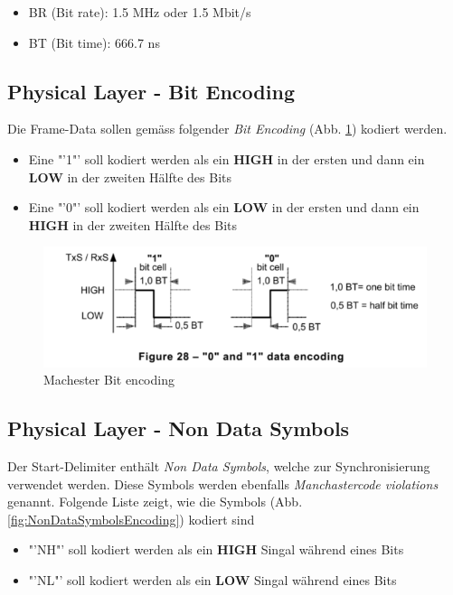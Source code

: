 \begin{itemize}
  \item BR (Bit rate): 1.5 MHz oder 1.5 Mbit/s
  \item BT (Bit time): 666.7 ns
\end{itemize}

\subsection{Physical Layer - Bit Encoding}
\label{sub:BitEncoding}
Die Frame-Data sollen gemäss folgender \textit{Bit Encoding} (Abb. \ref{fig:manchester_Bit_Encoding}) kodiert werden.

\begin{itemize}
    \item Eine "'1"' soll kodiert werden als ein \textbf{HIGH} in der ersten und dann ein \textbf{LOW} in der zweiten Hälfte des Bits
    \item Eine "'0"' soll kodiert werden als ein \textbf{LOW} in der ersten und dann ein \textbf{HIGH} in der zweiten Hälfte des Bits
\end{itemize}

\begin{figure}[H]
    \centering
    \includegraphics[width = 0.7 \textwidth]{Figures/Chap2/Grundlagen/MVB_DOKU/Layer/Bit_Encoding.png}
    \caption{Machester Bit encoding}
    \label{fig:manchester_Bit_Encoding}
\end{figure}

\subsection{Physical Layer - Non Data Symbols} 
\label{sub:NonDataSymbols}
Der Start-Delimiter enthält \textit{Non Data Symbols}, welche zur Synchronisierung verwendet werden. Diese Symbols werden ebenfalls \textit{Manchastercode violations} genannt. Folgende Liste zeigt, wie die Symbols (Abb. \ref{fig:NonDataSymbolsEncoding}) kodiert sind

\begin{itemize}
    \item "'NH"' soll kodiert werden als ein \textbf{HIGH} Singal während eines Bits 
    \item "'NL"' soll kodiert werden als ein \textbf{LOW} Singal während eines Bits
\end{itemize}

